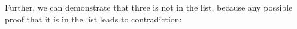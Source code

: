 \begin{fence}
\begin{code}%
\>[0]\AgdaFunction{\AgdaUnderscore{}}\AgdaSpace{}%
\AgdaSymbol{:}\AgdaSpace{}%
\AgdaSpace{}%
\AgdaSpace{}%
\AgdaOperator{\AgdaInductiveConstructor{[}}\AgdaSpace{}%
\AgdaSpace{}%
\AgdaOperator{\AgdaInductiveConstructor{,}}\AgdaSpace{}%
\AgdaSpace{}%
\AgdaOperator{\AgdaInductiveConstructor{,}}\AgdaSpace{}%
\AgdaSpace{}%
\AgdaOperator{\AgdaInductiveConstructor{,}}\AgdaSpace{}%
\AgdaSpace{}%
\AgdaOperator{\AgdaInductiveConstructor{]}}\<%
\\
\>[0]\AgdaSymbol{\AgdaUnderscore{}}\AgdaSpace{}%
\AgdaSymbol{=}\AgdaSpace{}%
\AgdaSpace{}%
\<%
\\
%
\\[\AgdaEmptyExtraSkip]%
\>[0]\AgdaFunction{\AgdaUnderscore{}}\AgdaSpace{}%
\AgdaSymbol{:}\AgdaSpace{}%
\AgdaSpace{}%
\AgdaSpace{}%
\AgdaOperator{\AgdaInductiveConstructor{[}}\AgdaSpace{}%
\AgdaSpace{}%
\AgdaOperator{\AgdaInductiveConstructor{,}}\AgdaSpace{}%
\AgdaSpace{}%
\AgdaOperator{\AgdaInductiveConstructor{,}}\AgdaSpace{}%
\AgdaSpace{}%
\AgdaOperator{\AgdaInductiveConstructor{,}}\AgdaSpace{}%
\AgdaSpace{}%
\AgdaOperator{\AgdaInductiveConstructor{]}}\<%
\\
\>[0]\AgdaSymbol{\AgdaUnderscore{}}\AgdaSpace{}%
\AgdaSymbol{=}\AgdaSpace{}%
\AgdaSpace{}%
\AgdaSymbol{(}\AgdaSpace{}%
\AgdaSymbol{(}\AgdaSpace{}%
\AgdaSymbol{))}\<%
\end{code}
\end{fence}

Further, we can demonstrate that three is not in the list, because any
possible proof that it is in the list leads to contradiction:

